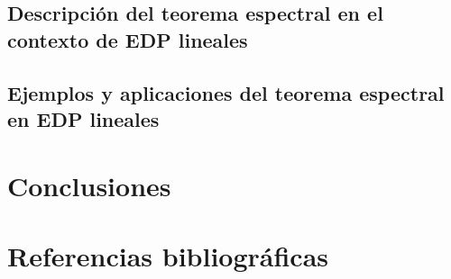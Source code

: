 \documentclass{article}
\begin{document}
    \subsection{Descripción del teorema espectral en el contexto de EDP lineales}
    \subsection{Ejemplos y aplicaciones del teorema espectral en EDP lineales}

\newpage

\section{Conclusiones}
\newpage

\section{Referencias bibliográficas}

\newpage
\end{document}
